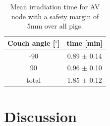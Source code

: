 \documentclass[type=dr, dr=rernat, accentcolor=tud7b,colorbacktitle, bigchapter, openright, twoside, 12pt ]{tudthesis}
\begin{document}
\begin{table}[H]
  \centering
  \caption{Mean irradiation time for AV node with a safety margin of 5mm over all pigs.}
  \begin{tabular}{|c|c|}
    \hline\hline
    Couch angle [$^{\circ}$] & time [min] \\
    \hline
    -90 & 0.89 $\pm$ 0.14 \\
    90 & 0.96 $\pm$ 0.10 \\ \hline
    total & 1.85 $\pm$ 0.12 \\
    \hline\hline
    \end{tabular}
  \label{tab:rescan_time:pigs}
\end{table}


\newpage

\section{Discussion}
\end{document}
